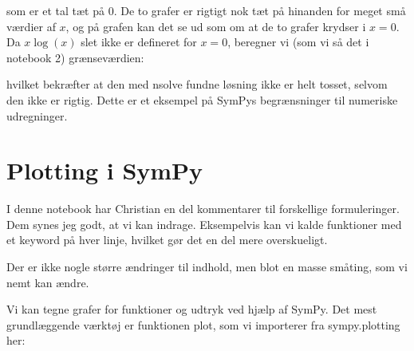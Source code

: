 \documentclass[letterpaper,10pt,english]{jupyterBook}
\begin{document}
\noindent{}

som er et tal tæt på 0. De to grafer er rigtigt nok tæt på hinanden for meget små værdier af \(x\), og på grafen kan det se ud som om at de to grafer krydser i \(x = 0\). Da \(x\log(x)\) slet ikke er defineret for \(x=0\), beregner vi (som vi så det i notebook 2)  grænseværdien:

\begin{sphinxVerbatim}[commandchars=\\\{\}]
        
\end{sphinxVerbatim}

\noindent{}

hvilket bekræfter at den med nsolve fundne løsning ikke er helt tosset, selvom den ikke er rigtig.
Dette er et eksempel på SymPys begrænsninger til numeriske udregninger.


\section{Plotting i SymPy}
\label{\detokenize{notebooks/sympy/Notebook3_plot:plotting-i-sympy}}\label{\detokenize{notebooks/sympy/Notebook3_plot::doc}}
I denne notebook har Christian en del kommentarer til forskellige formuleringer. Dem synes jeg godt, at vi kan indrage. Eksempelvis kan vi kalde funktioner med et keyword på hver linje, hvilket gør det en del mere overskueligt.

Der er ikke nogle større ændringer til indhold, men blot en masse småting, som vi nemt kan ændre.

Vi kan tegne grafer for funktioner og udtryk ved hjælp af SymPy. Det mest grundlæggende værktøj er funktionen plot, som vi importerer fra sympy.plotting her:
\end{document}
